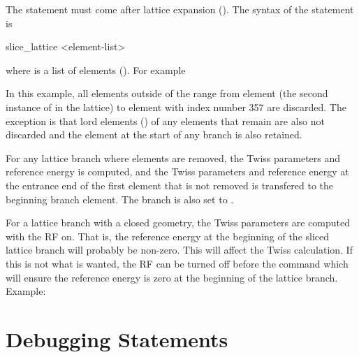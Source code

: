 {{{The  statement must come after lattice expansion (). The syntax of
the  statement is
\begin{example}
  slice_lattice <element-list>
\end{example}
where  is a list of elements (). For example
In this example, all elements outside of the range from element  (the second instance of
 in the lattice) to element with index number 357 are discarded. The exception is that lord
elements () of any elements that remain are also not discarded and the
 element at the start of any branch is also retained.

For any lattice branch where elements are removed, the Twiss parameters and reference energy is
computed, and the Twiss parameters and reference energy at the entrance end of the first element
that is not removed is transfered to the beginning branch element. The branch  is also
set to .

For a lattice branch with a closed geometry, the Twiss parameters are computed with the RF on.
That is, the reference energy at the beginning of the sliced lattice branch will probably be
non-zero. This will affect the Twiss calculation. If this is not what is wanted, the RF can
be turned off before the  command which will ensure the reference energy is
zero at the beginning of the lattice branch. Example: 

\section{Debugging Statements}
\label{s:debug}

}}}
